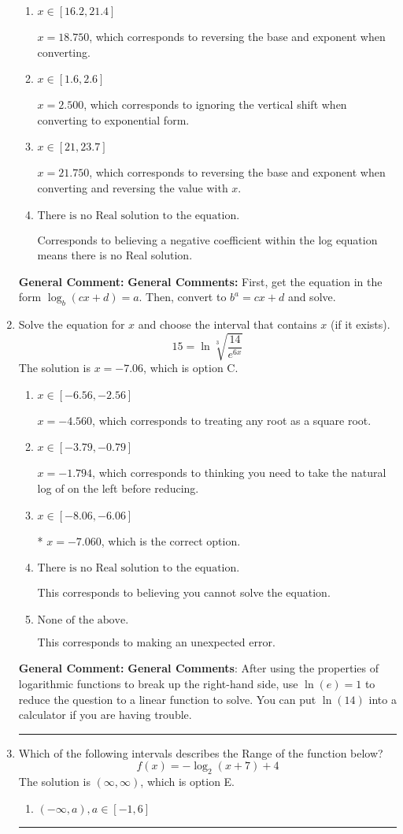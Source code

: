 \documentclass{extbook}[14pt]
\newcommand{\litem}[1]{\item #1

\rule{\textwidth}{0.4pt}}
\begin{document}
\begin{enumerate}
{\begin{enumerate}[label=\Alph*.]
* $x = -1.496$, which is the correct option.
\item \( x \in [16.2, 21.4] \)

$x = 18.750$, which corresponds to reversing the base and exponent when converting.
\item \( x \in [1.6, 2.6] \)

$x = 2.500$, which corresponds to ignoring the vertical shift when converting to exponential form.
\item \( x \in [21, 23.7] \)

$x = 21.750$, which corresponds to reversing the base and exponent when converting and reversing the value with $x$.
\item \( \text{There is no Real solution to the equation.} \)

Corresponds to believing a negative coefficient within the log equation means there is no Real solution.
\end{enumerate}

\textbf{General Comment:} \textbf{General Comments:} First, get the equation in the form $\log_b{(cx+d)} = a$. Then, convert to $b^a = cx+d$ and solve.
}
\litem{
 Solve the equation for $x$ and choose the interval that contains $x$ (if it exists).
\[  15 = \ln{\sqrt[3]{\frac{14}{e^{6x}}}} \]The solution is \( x = -7.06 \), which is option C.\begin{enumerate}[label=\Alph*.]
\item \( x \in [-6.56, -2.56] \)

$x = -4.560$, which corresponds to treating any root as a square root.
\item \( x \in [-3.79, -0.79] \)

$x = -1.794$, which corresponds to thinking you need to take the natural log of on the left before reducing.
\item \( x \in [-8.06, -6.06] \)

* $x = -7.060$, which is the correct option.
\item \( \text{There is no Real solution to the equation.} \)

This corresponds to believing you cannot solve the equation.
\item \( \text{None of the above.} \)

This corresponds to making an unexpected error.
\end{enumerate}

\textbf{General Comment:} \textbf{General Comments}: After using the properties of logarithmic functions to break up the right-hand side, use $\ln(e) = 1$ to reduce the question to a linear function to solve. You can put $\ln(14)$ into a calculator if you are having trouble.
}
\litem{
Which of the following intervals describes the Range of the function below?
\[ f(x) = -\log_2{(x+7)}+4 \]The solution is \( (\infty, \infty) \), which is option E.\begin{enumerate}[label=\Alph*.]
\item \( (-\infty, a), a \in [-1, 6] \)


\end{enumerate}}
\end{enumerate}
\end{document}
